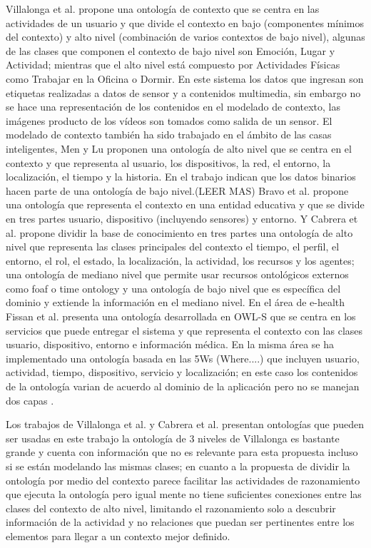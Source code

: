 Villalonga et al.\cite{Villalonga2015} propone una ontología de contexto que se centra en las actividades de un usuario y que divide el contexto en bajo (componentes mínimos del contexto) y alto nivel (combinación de varios contextos de bajo nivel), algunas de las clases que componen el contexto de bajo nivel son Emoción,  Lugar y Actividad; mientras que el alto nivel está compuesto por Actividades Físicas como Trabajar en la Oficina o Dormir. En este sistema los datos que ingresan son etiquetas realizadas a datos de sensor y a contenidos multimedia, sin embargo no se hace una representación de los contenidos en el modelado de contexto, las imágenes producto de los vídeos son tomados como salida de un sensor. El modelado de contexto también ha sido trabajado en el ámbito de las casas inteligentes, Men y Lu \cite{Meng2016} proponen una ontología de alto nivel que se centra en el contexto y que representa al usuario, los dispositivos, la red, el entorno, la localización, el tiempo y la historia. En el trabajo indican que los datos binarios hacen parte de una ontología de bajo nivel.(LEER MAS)
Bravo et al.\cite{Bravo2017} propone una ontología que representa el contexto en una entidad educativa y que se divide en tres partes usuario, dispositivo (incluyendo sensores) y entorno. Y Cabrera et al. \cite{Cabrera2017} propone dividir la base de conocimiento en tres partes una ontología de alto nivel que representa las clases principales del contexto el tiempo, el perfil, el entorno, el rol, el estado, la localización, la actividad, los recursos y los agentes; una ontología de mediano nivel que permite usar recursos ontológicos externos como foaf o time ontology y una ontología de bajo nivel que es específica del dominio y extiende la información en el mediano nivel.
En el área de e-health Fissan et al. \cite{Fissaa2017} presenta una ontología desarrollada en OWL-S que se centra en los servicios que puede entregar el sistema y que representa el contexto con las clases usuario, dispositivo, entorno e información médica. En la misma área se ha implementado una ontología basada en las 5Ws (Where....) que incluyen usuario, actividad, tiempo, dispositivo, servicio y localización; en este caso los contenidos de la ontología varian de acuerdo al dominio de la aplicación pero no se manejan dos capas \cite{Aguilar2017}.

Los trabajos de Villalonga et al.\cite{Villalonga2015} y Cabrera et al. \cite{Cabrera2017} presentan ontologías que pueden ser usadas en este trabajo la ontología de 3 niveles de Villalonga es bastante grande y cuenta con información que no es relevante para esta propuesta incluso si se están modelando las mismas clases; en cuanto a la propuesta de dividir la ontología por medio del contexto parece facilitar las actividades de razonamiento que ejecuta la ontología pero igual mente no tiene suficientes conexiones entre las clases del contexto de alto nivel, limitando el razonamiento solo a descubrir información de la actividad y no relaciones que puedan ser pertinentes entre los elementos para llegar a un contexto mejor definido.  %

